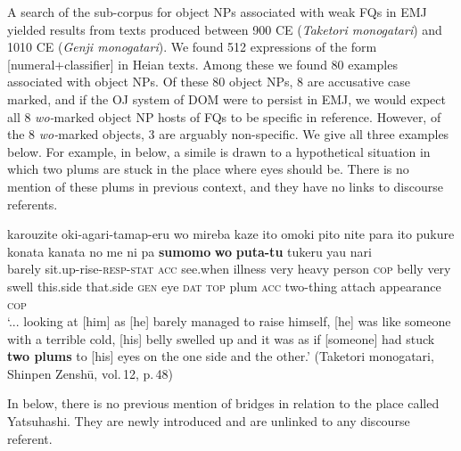\documentclass[output=paper]{LSP/langsci}
\begin{document}
A search of the sub-corpus for object NPs associated with weak FQs in
EMJ yielded results from texts produced between 900 CE
(\textit{Taketori monogatari}) and 1010 CE (\textit{Genji
 monogatari}). We found 512 expressions of the form
[numeral+classifier] in Heian texts. Among these we found 80 examples
associated with object NPs. Of these 80 object NPs, 8 are accusative
case marked, and if the OJ   system of DOM were to persist in EMJ, we
would expect all 8 \textit{wo-}marked object NP hosts of FQs
to be specific in reference. However, of the 8 \textit{wo-}marked
objects, 3 are arguably non-specific. We give all three examples
below. For example, in  below, a simile is drawn to a
hypothetical situation in which two plums are stuck in the place where
eyes should be. There is no mention of these plums in previous
context, and they have no links to  discourse referents.


\begin{exe}
\ex%
\label{07-fr-ex:35}
\gll karouzite oki-agari-tamap-eru wo mireba kaze ito omoki pito nite para ito pukure konata kanata no me ni pa \textbf{sumomo} \textbf{wo} \textbf{puta-tu} tukeru yau nari\\
barely sit.up-rise-\textsc{resp}-\textsc{stat} \textsc{acc} see.when illness very heavy person \textsc{cop} belly very swell this.side that.side \textsc{gen} eye \textsc{dat} \textsc{top}  plum \textsc{acc} two-thing  attach appearance \textsc{cop}\\
\glt ‘... looking at [him] as [he] barely managed to raise himself, [he] was like someone with a terrible cold, [his] belly swelled up and it was as if [someone] had stuck \textbf{two plums} to [his] eyes on the one side and the other.’  (Taketori monogatari, Shinpen Zenshū, vol.\,12, p.\,48)
\end{exe}

In  below, there is no previous mention of bridges in relation to the place called Yatsuhashi. They are newly introduced and are unlinked to any  discourse referent. 
 
\end{document}
